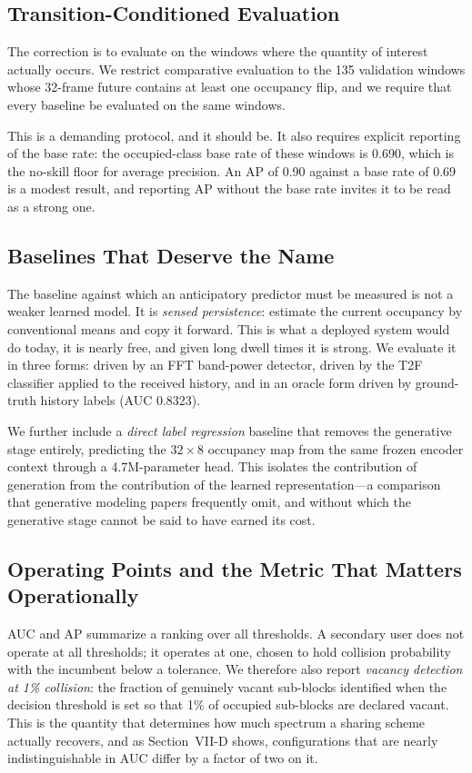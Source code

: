 \documentclass[lettersize,journal]{IEEEtran}
\begin{document}
\subsection{Transition-Conditioned Evaluation}
The correction is to evaluate on the windows where the quantity of
interest actually occurs. We restrict comparative evaluation to the 135
validation windows whose 32-frame future contains at least one occupancy
flip, and we require that every baseline be evaluated on the same
windows.

This is a demanding protocol, and it should be. It also requires
explicit reporting of the base rate: the occupied-class base rate of
these windows is 0.690, which is the no-skill floor for average
precision. An AP of 0.90 against a base rate of 0.69 is a modest result,
and reporting AP without the base rate invites it to be read as a strong
one.

\subsection{Baselines That Deserve the Name}
The baseline against which an anticipatory predictor must be measured is
not a weaker learned model. It is \emph{sensed persistence}: estimate the
current occupancy by conventional means and copy it forward. This is what
a deployed system would do today, it is nearly free, and given long dwell
times it is strong. We evaluate it in three forms: driven by an FFT
band-power detector, driven by the T2F classifier applied to the received
history, and in an oracle form driven by ground-truth history labels
(AUC 0.8323).

We further include a \emph{direct label regression} baseline that removes
the generative stage entirely, predicting the $32 \times 8$ occupancy map
from the same frozen encoder context through a 4.7M-parameter head. This
isolates the contribution of generation from the contribution of the
learned representation---a comparison that generative modeling papers
frequently omit, and without which the generative stage cannot be said to
have earned its cost.

\subsection{Operating Points and the Metric That Matters Operationally}
AUC and AP summarize a ranking over all thresholds. A secondary user does
not operate at all thresholds; it operates at one, chosen to hold
collision probability with the incumbent below a tolerance. We therefore
also report \emph{vacancy detection at 1\% collision}: the fraction of
genuinely vacant sub-blocks identified when the decision threshold is set
so that 1\% of occupied sub-blocks are declared vacant. This is the
quantity that determines how much spectrum a sharing scheme actually
recovers, and as Section~VII-D shows, configurations that are nearly
indistinguishable in AUC differ by a factor of two on it.
\end{document}
